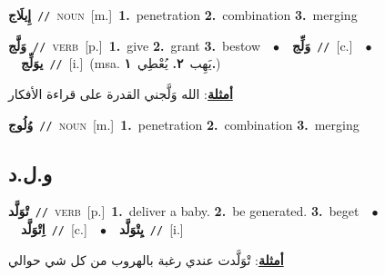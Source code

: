 \documentclass[10pt,a4paper,twoside]{article} %
\begin{document}
\begin{multicols}{2}
{\setlength\topsep{0pt}\textbf{\foreignlanguage{arabic}{إِيلَاج}}\ {\color{gray}\texttt{//}\color{black}}\ \textsc{noun}\ [m.]\ \textbf{1.}~penetration  \textbf{2.}~combination  \textbf{3.}~merging\ } \vspace{2mm}

{\setlength\topsep{0pt}\textbf{\foreignlanguage{arabic}{وَلَّج}}\ {\color{gray}\texttt{//}\color{black}}\ \textsc{verb}\ [p.]\ \textbf{1.}~give  \textbf{2.}~grant  \textbf{3.}~bestow\ \ $\bullet$\ \ \setlength\topsep{0pt}\textbf{\foreignlanguage{arabic}{وَلِّج}}\ {\color{gray}\texttt{//}\color{black}}\ [c.]\ \ $\bullet$\ \ \setlength\topsep{0pt}\textbf{\foreignlanguage{arabic}{يوَلِّج}}\ {\color{gray}\texttt{//}\color{black}}\ [i.]\ \color{gray}(msa. \foreignlanguage{arabic}{يَهِب}~\foreignlanguage{arabic}{\textbf{٢.}}  \foreignlanguage{arabic}{يُعْطِي}~\foreignlanguage{arabic}{\textbf{١.}})\color{black}\  \begin{flushright}\color{gray}\foreignlanguage{arabic}{\textbf{\underline{\foreignlanguage{arabic}{أمثلة}}}: الله وَلَّجني القدرة على قراءة الأفكار}\end{flushright}\color{black}} \vspace{2mm}

{\setlength\topsep{0pt}\textbf{\foreignlanguage{arabic}{وُلُوج}}\ {\color{gray}\texttt{//}\color{black}}\ \textsc{noun}\ [m.]\ \textbf{1.}~penetration  \textbf{2.}~combination  \textbf{3.}~merging\ } \vspace{2mm}

\vspace{-3mm}
\subsection*{\color{blue}\foreignlanguage{arabic}{و.ل.د}\color{blue}{}} 

{\setlength\topsep{0pt}\textbf{\foreignlanguage{arabic}{تْوَلَّد}}\ {\color{gray}\texttt{//}\color{black}}\ \textsc{verb}\ [p.]\ \textbf{1.}~deliver a baby.  \textbf{2.}~be generated.  \textbf{3.}~beget\ \ $\bullet$\ \ \setlength\topsep{0pt}\textbf{\foreignlanguage{arabic}{اِتْوَلَّد}}\ {\color{gray}\texttt{//}\color{black}}\ [c.]\ \ $\bullet$\ \ \setlength\topsep{0pt}\textbf{\foreignlanguage{arabic}{يِتْوَلَّد}}\ {\color{gray}\texttt{//}\color{black}}\ [i.]\  \begin{flushright}\color{gray}\foreignlanguage{arabic}{\textbf{\underline{\foreignlanguage{arabic}{أمثلة}}}: تْوَلَّدت عندي رغبة بالهروب من كل شي حوالي}\end{flushright}\color{black}} \vspace{2mm}


\end{multicols}
\end{document}
